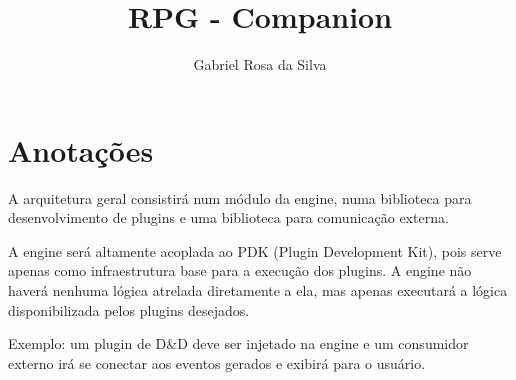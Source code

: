 \documentclass{article}
\author{Gabriel Rosa da Silva}
\title{RPG - Companion}
\begin{document}
	\maketitle
	
	\section{Anotações}
	
	A arquitetura geral consistirá num módulo da engine, numa biblioteca para desenvolvimento de plugins e uma biblioteca para comunicação externa.
	
	A engine será altamente acoplada ao PDK (Plugin Development Kit), pois serve apenas como infraestrutura base para a execução dos plugins. A engine não haverá nenhuma lógica atrelada diretamente a ela, mas apenas executará a lógica disponibilizada pelos plugins desejados.
	
	Exemplo: um plugin de D\&D deve ser injetado na engine e um consumidor externo irá se conectar aos eventos gerados e exibirá para o usuário.
	
\end{document}
